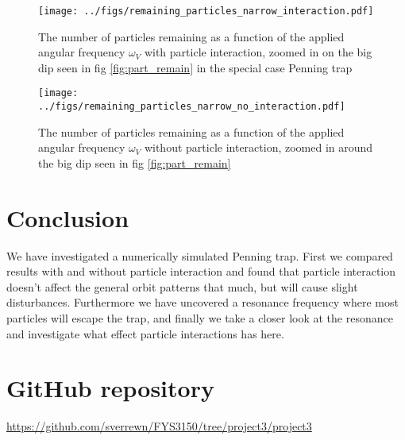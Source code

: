 \documentclass[english,notitlepage,reprint,nofootinbib]{revtex4-1}  %
\begin{document}
\begin{figure}[h!]
	\centering
	\texttt{[image: ../figs/remaining\_particles\_narrow\_interaction.pdf]} %
	\caption{The number of particles remaining as a function of the applied angular frequency $\omega_V$ with particle interaction, zoomed in on the big dip seen in fig \ref{fig:part_remain} in the special case Penning trap}
	\label{fig:narrow_i}
\end{figure}

\begin{figure}[h!]
	\centering
	\texttt{[image: ../figs/remaining\_particles\_narrow\_no\_interaction.pdf]} %
	\caption{The number of particles remaining as a function of the applied angular frequency $\omega_V$ without particle interaction, zoomed in around the big dip seen in fig \ref {fig:part_remain}}
	\label{fig:narrow_ni}
\end{figure}
	
	
	\section{Conclusion}\label{sec:conclusion}
	We have investigated a numerically simulated Penning trap. First we compared results with and without particle interaction and found that particle interaction doesn't affect the general orbit patterns that much, but will cause slight disturbances. Furthermore we have uncovered a resonance frequency where most particles will escape the trap, and finally we take a closer look at the resonance and investigate what effect particle interactions has here. 
	
	\appendix
	\section{GitHub repository}
	\url{https://github.com/sverrewn/FYS3150/tree/project3/project3}
	
\end{document}
